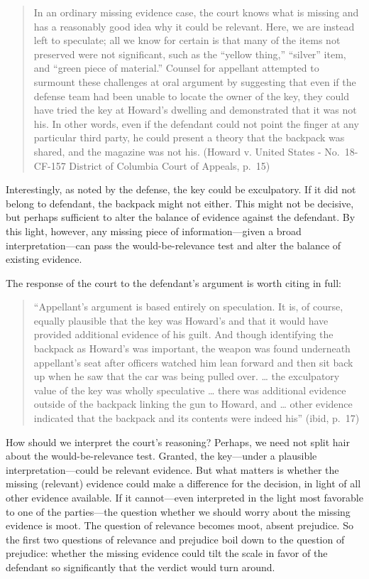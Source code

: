\documentclass[
  10pt,
  dvipsnames,enabledeprecatedfontcommands]{scrartcl}
\begin{document}
\begin{quote}
In an ordinary missing evidence case, the court knows what is missing
and has a reasonably good idea why it could be relevant. Here, we are
instead left to speculate; all we know for certain is that many of the
items not preserved were not significant, such as the ``yellow thing,''
``silver'' item, and ``green piece of material.'' Counsel for appellant
attempted to surmount these challenges at oral argument by suggesting
that even if the defense team had been unable to locate the owner of the
key, they could have tried the key at Howard's dwelling and demonstrated
that it was not his. In other words, even if the defendant could not
point the finger at any particular third party, he could present a
theory that the backpack was shared, and the magazine was not his.
(Howard v. United States - No.~18-CF-157 District of Columbia Court of
Appeals, p.~15)
\end{quote}

\noindent Interestingly, as noted by the defense, the key could be
exculpatory. If it did not belong to defendant, the backpack might not
either. This might not be decisive, but perhaps sufficient to alter the
balance of evidence against the defendant. By this light, however, any
missing piece of information---given a broad interpretation---can pass
the would-be-relevance test and alter the balance of existing evidence.

The response of the court to the defendant's argument is worth citing in
full:

\begin{quote}
``Appellant's argument is based entirely on speculation. It is, of
course, equally plausible that the key was Howard's and that it would
have provided additional evidence of his guilt. And though identifying
the backpack as Howard's was important, the weapon was found underneath
appellant's seat after officers watched him lean forward and then sit
back up when he saw that the car was being pulled over. \ldots{} the
exculpatory value of the key was wholly speculative \ldots{} there was
additional evidence outside of the backpack linking the gun to Howard,
and \ldots{} other evidence indicated that the backpack and its contents
were indeed his'' (ibid, p.~17)
\end{quote}

How should we interpret the court's reasoning? Perhaps, we need not
split hair about the would-be-relevance test. Granted, the key---under a
plausible interpretation---could be relevant evidence. But what matters
is whether the missing (relevant) evidence could make a difference for
the decision, in light of all other evidence available. If it
cannot---even interpreted in the light most favorable to one of the
parties---the question whether we should worry about the missing
evidence is moot. The question of relevance becomes moot, absent
prejudice. So the first two questions of relevance and prejudice boil
down to the question of prejudice: whether the missing evidence could
tilt the scale in favor of the defendant so significantly that the
verdict would turn around.
\end{document}
